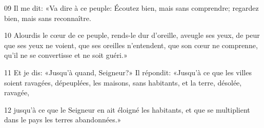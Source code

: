 
09 Il me dit: «Va dire à ce peuple: Écoutez bien, mais sans comprendre; regardez bien, mais sans reconnaître.

10 Alourdis le cœur de ce peuple, rends-le dur d’oreille, aveugle ses yeux, de peur que ses yeux ne voient, que ses oreilles n’entendent, que son cœur ne comprenne, qu’il ne se convertisse et ne soit guéri.»

11 Et je dis: «Jusqu’à quand, Seigneur?» Il répondit: «Jusqu’à ce que les villes soient ravagées, dépeuplées, les maisons, sans habitants, et la terre, désolée, ravagée,

12 jusqu’à ce que le Seigneur en ait éloigné les habitants, et que se multiplient dans le pays les terres abandonnées.»